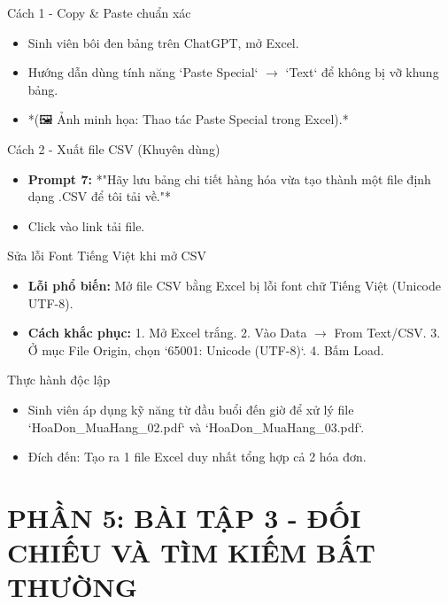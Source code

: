 \documentclass[aspectratio=169]{beamer}
\begin{document}
\begin{frame}{Cách 1 - Copy \& Paste chuẩn xác}
    \begin{itemize}
        \item Sinh viên bôi đen bảng trên ChatGPT, mở Excel.
        \item Hướng dẫn dùng tính năng `Paste Special` $\rightarrow$ `Text` để không bị vỡ khung bảng.
        \item *(🖼️ Ảnh minh họa: Thao tác Paste Special trong Excel).*
    \end{itemize}
\end{frame}


\begin{frame}{Cách 2 - Xuất file CSV (Khuyên dùng)}
    \begin{itemize}
        \item \textbf{Prompt 7:} *"Hãy lưu bảng chi tiết hàng hóa vừa tạo thành một file định dạng .CSV để tôi tải về."*
        \item Click vào link tải file.
    \end{itemize}
\end{frame}


\begin{frame}{Sửa lỗi Font Tiếng Việt khi mở CSV}
    \begin{itemize}
        \item \textbf{Lỗi phổ biến:} Mở file CSV bằng Excel bị lỗi font chữ Tiếng Việt (Unicode UTF-8).
        \item \textbf{Cách khắc phục:}
        1. Mở Excel trắng.
        2. Vào Data $\rightarrow$ From Text/CSV.
        3. Ở mục File Origin, chọn `65001: Unicode (UTF-8)`.
        4. Bấm Load.
    \end{itemize}
\end{frame}


\begin{frame}{Thực hành độc lập}
    \begin{itemize}
        \item Sinh viên áp dụng kỹ năng từ đầu buổi đến giờ để xử lý file `HoaDon\_MuaHang\_02.pdf` và `HoaDon\_MuaHang\_03.pdf`.
        \item Đích đến: Tạo ra 1 file Excel duy nhất tổng hợp cả 2 hóa đơn.
    \end{itemize}
\end{frame}


\section{PHẦN 5: BÀI TẬP 3 - ĐỐI CHIẾU VÀ TÌM KIẾM BẤT THƯỜNG}
\end{document}
